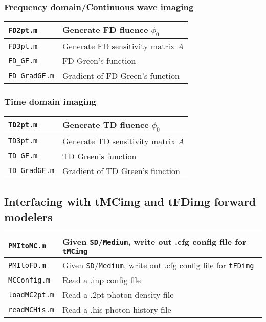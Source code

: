 \documentclass[12pt]{article}
\newcommand{\pmifield}[1]{{\tt #1}}
\newcommand{\pmifile}[1]{{\tt #1}}
\begin{document}
\subsubsection{Frequency domain/Continuous wave imaging}

\begin{tabular}{|l|l|}
\hline
\pmifile{FD2pt.m}           & Generate FD fluence $\phi_0$ \\ \hline
\pmifile{FD3pt.m}           & Generate FD sensitivity matrix $A$ \\ \hline
\pmifile{FD\_GF.m}          & FD Green's function\\ \hline
\pmifile{FD\_GradGF.m}      & Gradient of FD Green's function\\ \hline
\end{tabular}

\subsubsection{Time domain imaging}

\begin{tabular}{|l|l|}
\hline
\pmifile{TD2pt.m}      & Generate TD fluence $\phi_0$ \\ \hline
\pmifile{TD3pt.m}      & Generate TD sensitivity matrix $A$ \\ \hline
\pmifile{TD\_GF.m}     & TD Green's function \\ \hline
\pmifile{TD\_GradGF.m} & Gradient of TD Green's function \\ \hline
\end{tabular}

\subsection{Interfacing with tMCimg and tFDimg forward modelers}

\begin{tabular}{|l|l|}
\hline
\pmifile{PMItoMC.m}	& Given \pmifield{SD}/\pmifield{Medium}, write
			out .cfg config file for \pmifile{tMCimg} \\ \hline
\pmifile{PMItoFD.m}	& Given \pmifield{SD}/\pmifield{Medium}, write
			out .cfg config file for \pmifile{tFDimg} \\ \hline
\pmifile{MCConfig.m}	& Read a .inp config file \\ \hline
\pmifile{loadMC2pt.m}	& Read a .2pt photon density file \\ \hline
\pmifile{readMCHis.m}	& Read a .his photon history file \\ \hline
\end{tabular}
\end{document}
